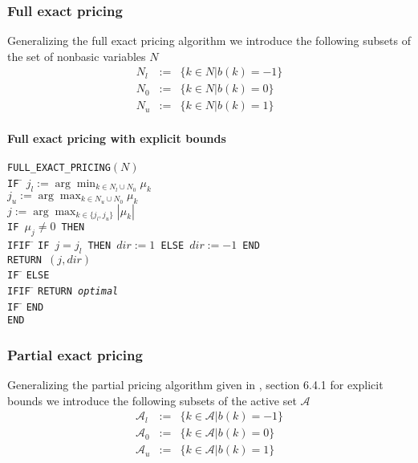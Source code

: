 \documentclass[a4paper]{article}
\begin{document}
\subsubsection{Full exact pricing}
Generalizing the full exact pricing algorithm we introduce the following subsets of the set of nonbasic variables $N$
\begin{eqnarray}
N_{l}&:=&\{k \in N\left|\right. b\left(k\right)=-1\} \\
N_{0}&:=&\{k \in N\left|\right. b\left(k\right)=0\} \\
N_{u}&:=&\{k \in N\left|\right. b\left(k\right)=1\}
\end{eqnarray}
\paragraph{Full exact pricing with explicit bounds}
\begin{tabbing}
\texttt{FULL\_EXACT\_PRICING$(N)$} \\
\texttt{IF} \= \kill
\> \texttt{$j_{l}:=\arg\min_{k \in N_{l} \cup
                               N_{0}}\mu_{k}$}  \\
\> \texttt{$j_{u}:=\arg\max_{k \in N_{u} \cup
                               N_{0}}\mu_{k}$}  \\
\> \texttt{$j:=\arg\max_{k \in \{j_{l}, j_{u}\}}\left|\mu_{k}\right|$}  \\
\> \texttt{IF $\mu_{j} \neq 0$ THEN} \\
\texttt{IFIF} \= \kill
\> \texttt{IF $j = j_{l}$ THEN $dir:=1$ ELSE $dir:=-1$ END} \\
\> \texttt{RETURN $(j, dir)$} \\
\texttt{IF} \= \kill
\> \texttt{ELSE} \\
\texttt{IFIF} \= \kill
\> \texttt{RETURN \emph{optimal}} \\
\texttt{IF} \= \kill
\> \texttt{END} \\
\texttt{END}
\end{tabbing}


\subsubsection{Partial exact pricing}
Generalizing the partial pricing algorithm given in \cite{Sven}, section 6.4.1 for explicit bounds we introduce the following subsets of the active set $\mathcal{A}$ 
\begin{eqnarray}
\mathcal{A}_{l}&:=&\{k \in \mathcal{A}\left|\right. b\left(k\right)=-1\} \\
\mathcal{A}_{0}&:=&\{k \in \mathcal{A}\left|\right. b\left(k\right)=0\} \\
\mathcal{A}_{u}&:=&\{k \in \mathcal{A}\left|\right. b\left(k\right)=1\}
\end{eqnarray}
\end{document}
